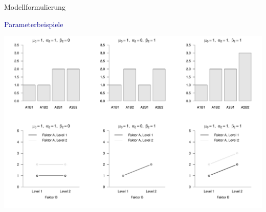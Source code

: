 \documentclass[
  8pt,
  ignorenonframetext,
]{beamer}
\begin{document}
\begin{frame}{Modellformulierung}
\protect\hypertarget{modellformulierung-3}{}
\vspace{1mm}

\textcolor{darkblue}{Parameterbeispiele}

\vfill
\vspace{3mm}
\center

\begin{center}\includegraphics[width=1\linewidth]{11_Abbildungen/alm_11_zva_add_beispiel} \end{center}
\vfill
\end{frame}
\end{document}
